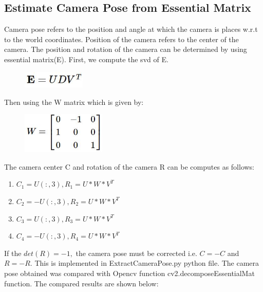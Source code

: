 \documentclass[12pt]{article}
\begin{document}
\subsection{Estimate Camera Pose from Essential Matrix}
Camera pose refers to the position and angle at which the camera is places w.r.t to the world coordinates. Position of the camera refers to the center of the camera. The position and rotation of the camera can be determined by using essential matrix(E). First, we compute the svd of E.
\begin{figure}[h]
    \centering
    \includegraphics[width=3cm]{EM3}
\end{figure}
\newline
Then using the W matrix which is given by:
\begin{figure}[h]
    \centering
    \includegraphics[width=4cm]{EM4}
\end{figure}
\newline
The camera center C and rotation of the camera R can be computes as follows:
\begin{enumerate}
\item $C_1 = U(:,3) , R_1 = U*W*V^{T}$
\item $C_2 = -U(:,3) , R_2 = U*W*V^{T}$
\item $C_3 = U(:,3) , R_3 = U*W*V^{T}$
\item $C_4 = -U(:,3) , R_4 = U*W*V^{T}$
\end{enumerate}
If the $det(R) = -1,$ the camera pose must be corrected i.e. $C=-C$ and $R=-R$. This is implemented in ExtractCameraPose.py python file. The camera pose obtained was compared with Opencv function cv2.decomposeEssentialMat function. The compared results are shown below:
\end{document}
